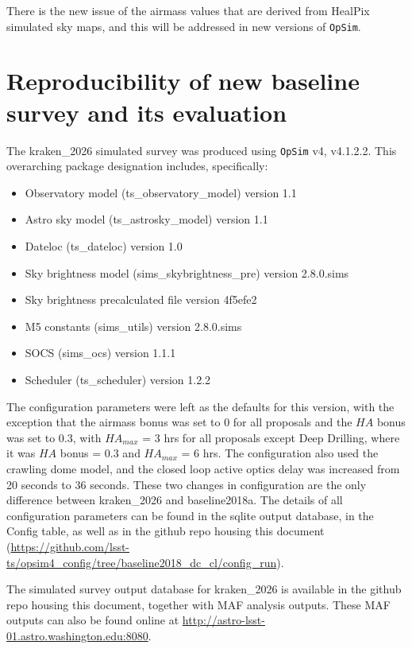 \documentclass[DM,authoryear,toc]{lsstdoc}
\newcommand{\opsim}{\texttt{OpSim}\xspace}
\begin{document}
There is the new issue of the airmass values that are derived from HealPix simulated sky maps, and this will be addressed
in new versions of \opsim.

\section{Reproducibility of new baseline survey and its evaluation}

The kraken\_2026  simulated survey was produced using \opsim v4, v4.1.2.2.  This overarching package designation includes, specifically:
\begin{itemize}
\item Observatory model (ts\_observatory\_model) version 1.1
\item Astro sky model (ts\_astrosky\_model) version 1.1
\item Dateloc (ts\_dateloc) version 1.0
\item Sky brightness model (sims\_skybrightness\_pre) version 2.8.0.sims
\item Sky brightness precalculated file version 4f5efe2
\item M5 constants (sims\_utils) version 2.8.0.sims
\item SOCS (sims\_ocs) version 1.1.1
\item Scheduler (ts\_scheduler) version 1.2.2
\end{itemize}

The configuration parameters were left as the defaults for this version, with the exception that the airmass bonus was set to 0 for all proposals and the $HA$ bonus was set to 0.3, with $HA_{max}$ = 3 hrs
for all proposals except Deep Drilling, where it was $HA$ bonus = 0.3 and $HA_{max}$ = 6 hrs. The configuration also used the
crawling dome model, and the closed loop active optics delay was increased from 20 seconds to 36 seconds.
These two changes in configuration are the only difference between kraken\_2026 and baseline2018a.
The details of all configuration parameters can be found in the sqlite output database, in the Config table, as well as in the
github repo housing this document (\url{https://github.com/lsst-ts/opsim4_config/tree/baseline2018_dc_cl/config_run}).

The simulated survey output database for kraken\_2026 is available in the github repo housing this document, together with MAF analysis outputs.
These MAF outputs can also be found online at \url{http://astro-lsst-01.astro.washington.edu:8080}.

\end{document}

